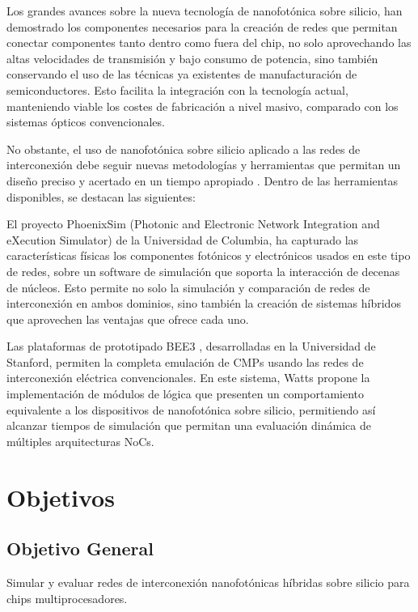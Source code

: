 Los grandes avances sobre la nueva tecnología de nanofotónica sobre silicio, han
demostrado los componentes necesarios \cite{Chan2011} para la creación de redes que permitan
conectar componentes tanto dentro como fuera del chip, no solo aprovechando las
altas velocidades de transmisión y bajo consumo de potencia, sino también
conservando el uso de las técnicas ya existentes de manufacturación de
semiconductores. Esto facilita la integración con la tecnología actual, manteniendo
viable los costes de fabricación a nivel masivo, comparado con los sistemas ópticos
convencionales.

No obstante, el uso de nanofotónica sobre silicio aplicado a las redes de interconexión
debe seguir nuevas metodologías y herramientas que permitan un diseño preciso y
acertado en un tiempo apropiado \cite{Chan2010b}. Dentro de las herramientas disponibles, se
destacan las siguientes:

El proyecto PhoenixSim \cite{Chan2010} 
(Photonic and Electronic Network Integration and eXecution
Simulator) de la Universidad de Columbia, ha capturado las características físicas los
componentes fotónicos y electrónicos usados en este tipo de redes, sobre un software
de simulación que soporta la interacción de decenas de núcleos. Esto permite no solo la
simulación y comparación de redes de interconexión en ambos dominios, sino también
la creación de sistemas híbridos que aprovechen las ventajas que ofrece cada uno.

Las plataformas de prototipado BEE3 \cite{davis2009bee3}, 
desarrolladas en la Universidad de Stanford,
permiten la completa emulación de CMPs usando las redes de interconexión eléctrica
convencionales. En este sistema, Watts \cite{TODO} propone la implementación de módulos de
lógica que presenten un comportamiento equivalente a los dispositivos de nanofotónica
sobre silicio, permitiendo así alcanzar tiempos de simulación que permitan una
evaluación dinámica de múltiples arquitecturas NoCs.


\section{Objetivos}
\subsection{Objetivo General}
Simular y evaluar redes de interconexión nanofotónicas híbridas 
sobre silicio para chips multiprocesadores.

